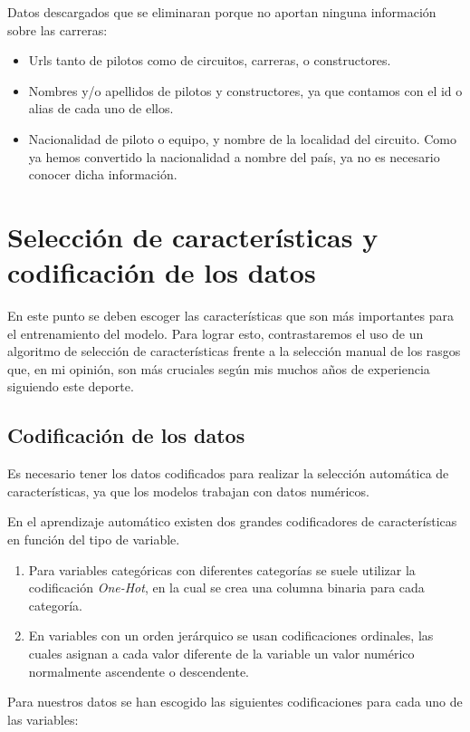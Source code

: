 Datos descargados que se eliminaran porque no aportan ninguna información sobre las carreras: 
    \begin{itemize}
        \item Urls tanto de pilotos como de circuitos, carreras, o constructores.
        \item Nombres y/o apellidos de pilotos y constructores, ya que contamos con el id o alias de cada uno de ellos.
        \item Nacionalidad de piloto o equipo, y nombre de la localidad del circuito. Como ya hemos convertido la nacionalidad a nombre del país, ya no es necesario conocer dicha información.
    \end{itemize}


\section{Selección de características y codificación de los datos}

En este punto se deben escoger las características que son más importantes para el entrenamiento del modelo. Para lograr esto, contrastaremos el uso de un algoritmo de selección de características frente a la selección manual de los rasgos que, en mi opinión, son más cruciales según mis muchos años de experiencia siguiendo este deporte. 

\subsection{Codificación de los datos}

Es necesario tener los datos codificados para realizar la selección automática de características, ya que los modelos trabajan con datos numéricos.

En el aprendizaje automático existen dos grandes codificadores de características en función del tipo de variable. 
\begin{enumerate} 
    \item Para variables categóricas con diferentes categorías se suele utilizar la codificación \textit{One-Hot}, en la cual se crea una columna binaria para cada categoría.
    \item En variables con un orden jerárquico se usan codificaciones ordinales, las cuales asignan a cada valor diferente de la variable un valor numérico normalmente ascendente o descendente.
\end{enumerate}

Para nuestros datos se han escogido las siguientes codificaciones para cada uno de las variables:

